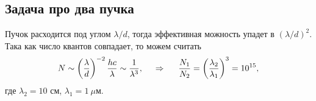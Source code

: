 \subsection*{Задача про два пучка}

Пучок расходится под углом $\lambda/d$, тогда эффективная можность упадет в $(\lambda/d)^2$. Така как число квантов совпадает, то можем считать
\begin{equation*}
    N \sim \left(\frac{\lambda}{d}\right)^{-2} \frac{h c}{\lambda} \sim \frac{1}{\lambda^3},
    \hspace{0.5cm} \Rightarrow \hspace{0.5cm}
    \frac{N_1}{N_2} = \left(\frac{\lambda_2}{\lambda_1}\right)^3 =  10^{15},
\end{equation*}
где $\lambda_2 = 10$ см,  $\lambda_1 = 1\ \mu$м.